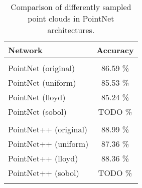 \begin{table}[]
	\centering
	\begin{tabular}{lc}
		\hline
		\textbf{Network}      & Accuracy \\ \hline
		                      &          \\
		PointNet (original)   & 86.59 \% \\
		PointNet (uniform)    & 85.53 \% \\
		PointNet (lloyd)      & 85.24 \% \\
		PointNet (sobol)      & TODO \%  \\
		                      &          \\
		PointNet++ (original) & 88.99 \% \\
		PointNet++ (uniform)  & 87.36 \% \\
		PointNet++ (lloyd)    & 88.36 \% \\
		PointNet++ (sobol)    & TODO \% \\
		                      &          \\ \hline
	\end{tabular}
\caption{Comparison of differently sampled point clouds in PointNet architectures.}
\label{Table:pn}
\end{table}